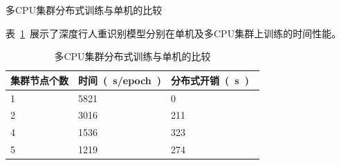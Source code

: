 \begin{frame}{多CPU集群分布式训练与单机的比较}
    \begin{block}

        表~\ref{tab:comp1}~展示了深度行人重识别模型分别在单机及多CPU集群上训练的时间性能。
    \end{block}
    \begin{table}
        \centering
        \footnotesize
        \begin{tabularx}{\textwidth}{X<{\centering}X<{\centering}X<{\centering}}
            \toprule
            集群节点个数 & 时间~(~s/epoch~) & 分布式开销~(~s~)~\tnote{a} \\ \midrule
            1 & 5821 & 0   \\
            2 & 3016 & 211 \\
            4 & 1536 & 323 \\
            5 & 1219 & 274 \\ \bottomrule
        \end{tabularx}
        \caption{多CPU集群分布式训练与单机的比较}
        \label{tab:comp1}
    \end{table}
\end{frame}